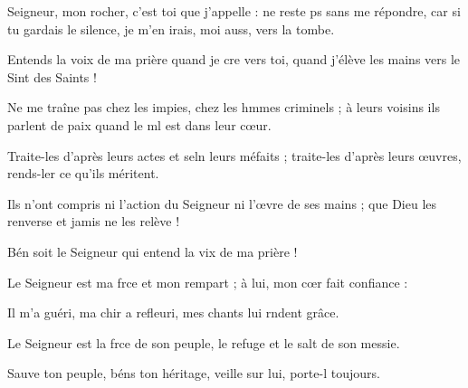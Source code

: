 \item Seigneur, mon rocher, c’est toi que j’appelle :\pscross{} ne reste ps sans me répondre,\psstar{} car si tu gardais le silence, je m’en irais, moi auss, vers la tombe.
\item Entends la voix de ma prière quand je cre vers toi,\psstar{} quand j’élève les mains vers le Sint des Saints !
\item Ne me traîne pas chez les impies, chez les hmmes criminels ;\psstar{} à leurs voisins ils parlent de paix quand le ml est dans leur cœur.
\item Traite-les d’après leurs actes et seln leurs méfaits ;\psstar{} traite-les d’après leurs œuvres, rends-ler ce qu’ils méritent.
\item Ils n’ont compris ni l’action du Seigneur ni l’œvre de ses mains ;\psstar{} que Dieu les renverse et jamis ne les relève !
\item Bén soit le Seigneur\psstar{} qui entend la vix de ma prière !
\item Le Seigneur est ma frce et mon rempart ;\psstar{} à lui, mon cœr fait confiance :
\item Il m’a guéri, ma chir a refleuri,\psstar{} mes chants lui rndent grâce.
\item Le Seigneur est la frce de son peuple,\psstar{} le refuge et le salt de son messie.
\item Sauve ton peuple, béns ton héritage,\psstar{} veille sur lui, porte-l toujours.